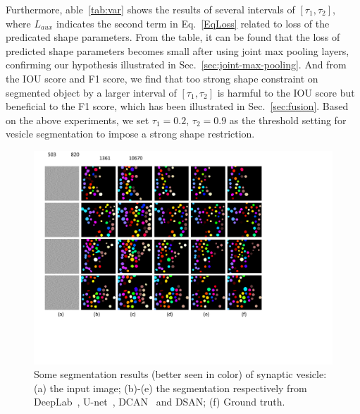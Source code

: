 Furthermore, able~\ref{tab:var} shows the results of several intervals of $[\tau_1,\tau_2]$, where $L_{aux}$ indicates the second term in Eq.~\ref{EqLoss} related to loss of the predicated shape parameters.
From the table, it can be found that the loss of predicted shape parameters becomes small after using joint max pooling layers, confirming our hypothesis illustrated in Sec.~\ref{sec:joint-max-pooling}.
And from the IOU score and F1 score, we find that too strong shape constraint on segmented object by a larger interval of $[\tau_1,\tau_2]$ is harmful to the IOU score but beneficial to the F1 score, which has been illustrated in Sec.~\ref{sec:fusion}.
Based on the above experiments, we set $\tau_1=0.2$, $\tau_2=0.9$ as the threshold setting for vesicle segmentation to impose a strong shape restriction.
\begin{figure}
    \begin{center}
        \includegraphics[width=6.8in]{figures/FigVesicle.pdf}
    \end{center}
    \caption{Some segmentation results (better seen in color) of synaptic vesicle: (a) the input image; (b)-(e) the segmentation respectively from DeepLab~\cite{Chen2014a}, U-net~\cite{Ronneberger2015}, DCAN~\cite{Chen2016a} and DSAN; (f) Ground truth.}
    \label{FigVesicle}
\end{figure}


